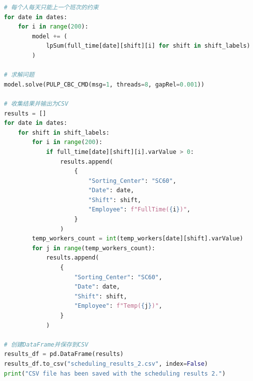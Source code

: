 \documentclass[UTF8]{article}%
\begin{document}
\begin{lstlisting}[language=python]
# 每个人每天只能上一个班次的约束
for date in dates:
    for i in range(200):
        model += (
            lpSum(full_time[date][shift][i] for shift in shift_labels) <= 1
        )

# 求解问题
model.solve(PULP_CBC_CMD(msg=1, threads=8, gapRel=0.001))

# 收集结果并输出为CSV
results = []
for date in dates:
    for shift in shift_labels:
        for i in range(200):
            if full_time[date][shift][i].varValue > 0:
                results.append(
                    {
                        "Sorting_Center": "SC60",
                        "Date": date,
                        "Shift": shift,
                        "Employee": f"FullTime({i})",
                    }
                )
        temp_workers_count = int(temp_workers[date][shift].varValue)
        for j in range(temp_workers_count):
            results.append(
                {
                    "Sorting_Center": "SC60",
                    "Date": date,
                    "Shift": shift,
                    "Employee": f"Temp({j})",
                }
            )

# 创建DataFrame并保存到CSV
results_df = pd.DataFrame(results)
results_df.to_csv("scheduling_results_2.csv", index=False)
print("CSV file has been saved with the scheduling results 2.")
\end{lstlisting}
\end{document}

